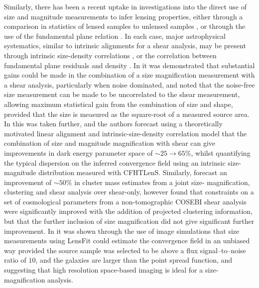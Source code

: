 \documentclass[useAMS,usenatbib,times,letter,amssymb]{mn2e}
\begin{document}
Similarly, there has been a recent uptake in investigations into the direct use of size and magnitude measurements to infer lensing properties, either through a comparison in statistics of lensed samples to unlensed samples \citep{Heavens:2013p1550,Alsing:2014p2846,Casaponsa:2013p1480}, or through the use of the fundamental plane relation \citep{Huff:2011p1392,Sonnenfeld:2011p1035,Bertin:2006p2063} . In each case, major astrophysical systematics, similar to intrinsic alignments for a shear analysis, may be present through intrinsic size-density correlations \citep{Ciarlariello:2014p2844}, or the correlation between fundamental plane residuals and density \citep{2015arXiv150402662J}.  In \cite{Heavens:2013p1550} it was demonstrated that substantial gains could be made in the combination of a size magnification measurement with a shear analysis, particularly when noise dominated, and noted that the noise-free size measurement can be made to be uncorrelated to the shear measurement, allowing maximum statistical gain from the combination of size and shape, provided that the size is measured as the square-root of a measured source area. In \cite{Alsing:2014p2846} this was taken further, and the authors forecast using a theoretically motivated linear alignment and intrinsic-size-density correlation model that the combination of size and magnitude magnification with shear can give improvements in dark energy parameter space of $\sim 25\to65\%$, whilst quantifying the typical dispersion on the inferred convergence field using an intrinsic size-magnitude distribution measured with CFHTLenS. Similarly, \cite{Rozo:2010p1496} forecast an improvement of $\sim 50\%$ in cluster mass estimates from a joint size- magnification, clustering and shear analysis over shear-only, however \cite{Eifler:2013p2722} found that constraints on a set of cosmological parameters from a non-tomographic COSEBI shear analysis were significantly improved with the addition of projected clustering information, but that the further inclusion of size magnification did not give significant further improvement. In \cite{Casaponsa:2013p1480} it was shown through the use of image simulations that size measurements using LensFit \cite{Miller:2007p2375} could estimate the convergence field in an unbiased way provided the source sample was selected to be above a flux signal--to--noise ratio of $10$, and the galaxies are larger than the point spread function, and suggesting that high resolution space-based imaging is ideal for a size-magnification analysis. 
\end{document}
